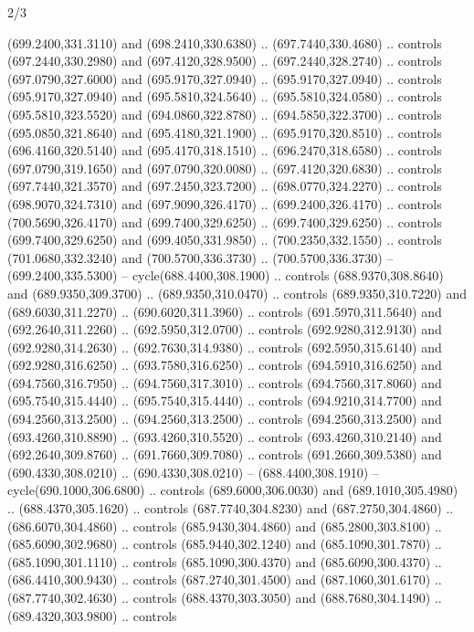 \begin{flagdescription}{2/3}
\begin{scope}[xshift=0.5\flaglength,yshift=0.5\flagwidth,scale=\flagwidth/638.38]
\begin{scope}[y=0.80pt, x=0.80pt, yscale=-1,shift={(-600,-400)}]
\begin{scope}[shift={(-0.02,2.173)}]
  (699.2400,331.3110) and (698.2410,330.6380) .. (697.7440,330.4680) .. controls
  (697.2440,330.2980) and (697.4120,328.9500) .. (697.2440,328.2740) .. controls
  (697.0790,327.6000) and (695.9170,327.0940) .. (695.9170,327.0940) .. controls
  (695.9170,327.0940) and (695.5810,324.5640) .. (695.5810,324.0580) .. controls
  (695.5810,323.5520) and (694.0860,322.8780) .. (694.5850,322.3700) .. controls
  (695.0850,321.8640) and (695.4180,321.1900) .. (695.9170,320.8510) .. controls
  (696.4160,320.5140) and (695.4170,318.1510) .. (696.2470,318.6580) .. controls
  (697.0790,319.1650) and (697.0790,320.0080) .. (697.4120,320.6830) .. controls
  (697.7440,321.3570) and (697.2450,323.7200) .. (698.0770,324.2270) .. controls
  (698.9070,324.7310) and (697.9090,326.4170) .. (699.2400,326.4170) .. controls
  (700.5690,326.4170) and (699.7400,329.6250) .. (699.7400,329.6250) .. controls
  (699.7400,329.6250) and (699.4050,331.9850) .. (700.2350,332.1550) .. controls
  (701.0680,332.3240) and (700.5700,336.3730) .. (700.5700,336.3730) --
  (699.2400,335.5300) -- cycle(688.4400,308.1900) .. controls
  (688.9370,308.8640) and (689.9350,309.3700) .. (689.9350,310.0470) .. controls
  (689.9350,310.7220) and (689.6030,311.2270) .. (690.6020,311.3960) .. controls
  (691.5970,311.5640) and (692.2640,311.2260) .. (692.5950,312.0700) .. controls
  (692.9280,312.9130) and (692.9280,314.2630) .. (692.7630,314.9380) .. controls
  (692.5950,315.6140) and (692.9280,316.6250) .. (693.7580,316.6250) .. controls
  (694.5910,316.6250) and (694.7560,316.7950) .. (694.7560,317.3010) .. controls
  (694.7560,317.8060) and (695.7540,315.4440) .. (695.7540,315.4440) .. controls
  (694.9210,314.7700) and (694.2560,313.2500) .. (694.2560,313.2500) .. controls
  (694.2560,313.2500) and (693.4260,310.8890) .. (693.4260,310.5520) .. controls
  (693.4260,310.2140) and (692.2640,309.8760) .. (691.7660,309.7080) .. controls
  (691.2660,309.5380) and (690.4330,308.0210) .. (690.4330,308.0210) --
  (688.4400,308.1910) -- cycle(690.1000,306.6800) .. controls
  (689.6000,306.0030) and (689.1010,305.4980) .. (688.4370,305.1620) .. controls
  (687.7740,304.8230) and (687.2750,304.4860) .. (686.6070,304.4860) .. controls
  (685.9430,304.4860) and (685.2800,303.8100) .. (685.6090,302.9680) .. controls
  (685.9440,302.1240) and (685.1090,301.7870) .. (685.1090,301.1110) .. controls
  (685.1090,300.4370) and (685.6090,300.4370) .. (686.4410,300.9430) .. controls
  (687.2740,301.4500) and (687.1060,301.6170) .. (687.7740,302.4630) .. controls
  (688.4370,303.3050) and (688.7680,304.1490) .. (689.4320,303.9800) .. controls

\end{scope}
\end{scope}
\end{scope}
\end{flagdescription}
